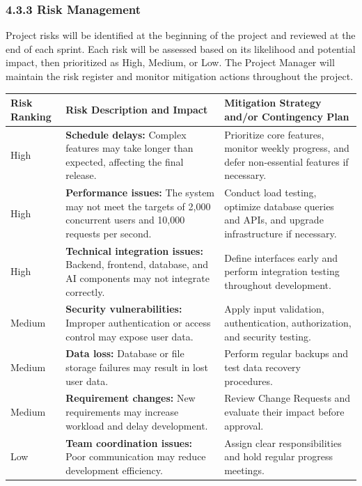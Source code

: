 \documentclass[12pt]{article}
\renewcommand{\baselinestretch}{1.5}
\begin{document}
\subsubsection*{4.3.3 Risk Management}
\par\medskip
Project risks will be identified at the beginning of the project and reviewed at the end of each sprint. Each risk will be assessed based on its likelihood and potential impact, then prioritized as High, Medium, or Low. The Project Manager will maintain the risk register and monitor mitigation actions throughout the project.
\par\medskip
\begingroup
\scriptsize
\renewcommand{\baselinestretch}{1.0}\selectfont
\renewcommand{\arraystretch}{1.15}
\setlength{\tabcolsep}{4pt}
\begin{longtable}{|>{\raggedright\arraybackslash}p{}|>{\raggedright\arraybackslash}p{}|>{\raggedright\arraybackslash}p{}|}
\hline
Risk Ranking & Risk Description and Impact & Mitigation Strategy and/\allowbreak{}or Contingency Plan \\ \hline
\endhead
High & \textbf{Schedule delays:} Complex features may take longer than expected, affecting the final release. & Prioritize core features, monitor weekly progress, and defer non-essential features if necessary. \\ \hline
High & \textbf{Performance issues:} The system may not meet the targets of 2,000 concurrent users and 10,000 requests per second. & Conduct load testing, optimize database queries and APIs, and upgrade infrastructure if necessary. \\ \hline
High & \textbf{Technical integration issues:} Backend, frontend, database, and AI components may not integrate correctly. & Define interfaces early and perform integration testing throughout development. \\ \hline
Medium & \textbf{Security vulnerabilities:} Improper authentication or access control may expose user data. & Apply input validation, authentication, authorization, and security testing. \\ \hline
Medium & \textbf{Data loss:} Database or file storage failures may result in lost user data. & Perform regular backups and test data recovery procedures. \\ \hline
Medium & \textbf{Requirement changes:} New requirements may increase workload and delay development. & Review Change Requests and evaluate their impact before approval. \\ \hline
Low & \textbf{Team coordination issues:} Poor communication may reduce development efficiency. & Assign clear responsibilities and hold regular progress meetings. \\ \hline
\end{longtable}
\endgroup
\par\medskip
\hypertarget{sec:project-close-out}{}
\end{document}
